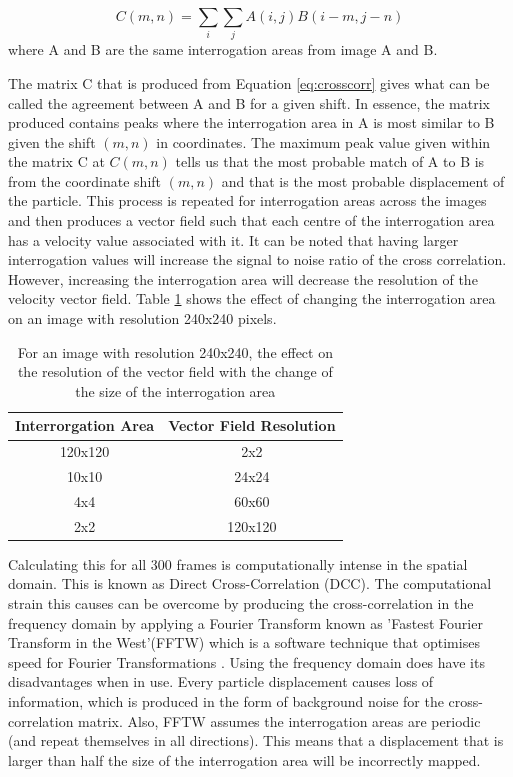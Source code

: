  \begin{equation}\label{eq:crosscorr}
 C(m,n)=\sum_{i}\sum_{j}A(i,j)B(i-m,j-n)
 \end{equation}
where A and B are the same interrogation areas from image A and B.

The matrix C that is produced from Equation \ref{eq:crosscorr} gives what can be called the agreement between A and B for a given shift. In essence, the matrix produced contains peaks where the interrogation area in A is most similar to B given the shift $(m,n)$ in coordinates. The maximum peak value given within the matrix C at $C(m,n)$ tells us that the most probable match of A to B is from the coordinate shift $(m,n)$ and that is the most probable displacement of the particle. This process is repeated for interrogation areas across the images and then produces a vector field such that each centre of the interrogation area has a velocity value associated with it. It can be noted that having larger interrogation values will increase the signal to noise ratio of the cross correlation. However, increasing the interrogation area will decrease the resolution of the velocity vector field. Table \ref{table:vecres} shows the effect of changing the interrogation area on an image with resolution 240x240 pixels.
\begin{table}[H]
\begin{center}
\begin{tabular}{| c | c| }
	\hline
    Interrorgation Area & Vector Field Resolution \\
    \hline
    120x120 & 2x2\\
    \hline
    10x10 & 24x24\\
    \hline
    4x4 & 60x60\\
    \hline
    2x2 & 120x120\\
    \hline

\end{tabular}
\caption{For an image with resolution 240x240, the effect on the resolution of the vector field with the change of the size of the interrogation area}
\label{table:vecres}
\end{center}
\end{table}
Calculating this for all 300 frames is computationally intense in the spatial domain. This is known as Direct Cross-Correlation (DCC). The computational strain this causes can be overcome by producing the cross-correlation in the frequency domain by applying a Fourier Transform known as 'Fastest Fourier Transform in the West'(FFTW) which is a software technique that optimises speed for Fourier Transformations \cite{fftw3}. Using the frequency domain does have its disadvantages when in use. Every particle displacement causes loss of information, which is produced in the form of background noise for the cross-correlation matrix. Also, FFTW assumes the interrogation areas are periodic (and repeat themselves in all directions). This means that a displacement that is larger than half the size of the interrogation area will be incorrectly mapped.

